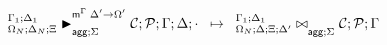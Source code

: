 \[
\trans{
   \matstatea{\Delta_N}{\lstack{C};
      \lstack{P}}{\Gamma}{\Delta}{\cdot}{\Delta' \rightarrow
         \Omega'}{\Sigma}
}
{
   \fixstatea{\Delta}{\Xi; \Delta'}{\lstack{C}; \lstack{P}}{\Gamma}{\Sigma}
}
\]
